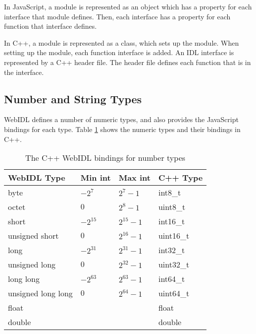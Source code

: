 In JavaScript, a module is represented as an object which has a property for each interface that module defines. Then, each interface has a property for each function that interface defines. 

In C++, a module is represented as a class, which sets up the module. When setting up the module, each function interface is added. An IDL interface is represented by a C++ header file. The header file defines each function that is in the interface.


\subsection{Number and String Types} %
\label{sub:number_types}
WebIDL defines a number of numeric types, and also provides the JavaScript bindings for each type. Table \ref{table:webidl_cpp_numbers} shows the numeric types and their bindings in C++.

\begin{table}[h]
\centering
\begin{tabular}{l|lll}
\textbf{WebIDL Type} & \textbf{Min int} & \textbf{Max int} & \textbf{C++ Type}  \\ \hline
byte                 & $-2^{7}$         & $2^{7}-1$        & int8\_t            \\
octet                & $0$              & $2^{8}-1$        & uint8\_t           \\
short                & $-2^{15}$        & $2^{15}-1$       & int16\_t           \\
unsigned short       & $0$              & $2^{16}-1$       & uint16\_t          \\
long                 & $-2^{31}$        & $2^{31}-1$       & int32\_t           \\
unsigned long        & $0$              & $2^{32}-1$       & uint32\_t          \\
long long            & $-2^{63}$        & $2^{63}-1$       & int64\_t           \\
unsigned long long   & $0$              & $2^{64}-1$       & uint64\_t          \\
float                &                  &                  & float              \\
double               &                  &                  & double           
\end{tabular}
\caption{The C++ WebIDL bindings for number types}
\label{table:webidl_cpp_numbers}
\end{table}

